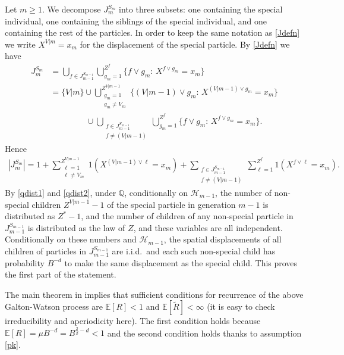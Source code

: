 \documentclass[12pt]{article}
\makeatletter
\renewenvironment{proof}[1][\proofname]{%
\par\pushQED{\qed}\normalfont%
\topsep6\p@\@plus6\p@\relax
\trivlist\item[\hskip\labelsep\bfseries#1\@addpunct{.}]%
\ignorespaces
}{%
\popQED\endtrivlist\@endpefalse
}
\numberwithin{theorem}{section}
\theoremstyle{def}
\numberwithin{equation}{section}
\newcommand{\E}{\mathbb{E}}
\newcommand{\Q}{\mathbb{Q}}
\newcommand{\cH}{\mathcal H}
\makeatother
\begin{document}
\begin{proof}
Let $m\geq 1$. We decompose $J^{S_m}_m$ into three subsets: one containing the special individual, one containing the siblings of the special individual, and one containing the rest of the particles. 
In order to keep the same notation as \eqref{Jdefn} we write $X^{V|m}= x_m$ for the displacement of the special particle. By \eqref{Jdefn} we have
\begin{align*}
J^{S_m}_m&=\bigcup_{f\in J_{m-1}^{S_{m-1}}}\bigcup_{g_m=1}^{Z^f}\{f\vee g_m:\, X^{f\vee g_m}=x_m\}\\
&=\{V|m\} \cup \bigcup_{\substack{g_m=1\\ g_m\neq V_m}}^{Z^{V|m-1}} \{(V|m-1)\vee g_m:\, X^{(V|m-1)\vee g_m}=x_m\}\\
&\phantom{=\{V|m\}\ } \cup \bigcup_{\substack {f\in J_{m-1}^{S_{m-1}}\\ f \neq(V|m-1)}}\bigcup_{g_m=1}^{Z^f}\{f\vee g_m:\, X^{f\vee g_m}=x_m \}.
\end{align*}
Hence
	\begin{align*}
		|J^{S_m}_m|= 1 + \sum_{\substack{\ell=1\\ \ell\neq V_m}}^{Z^{V|m-1}} 1(X^{(V|m-1)\vee\ell}=x_m) + \sum_{\substack {f\in J_{m-1}^{S_{m-1}}\\ f \neq(V|m-1)}}\sum_{\ell=1}^{Z^f}1(X^{f\vee\ell}=x_m).
	\end{align*}
By \eqref{qdist1} and \eqref{qdist2}, under $\Q$, conditionally on $\cH_{m-1}$, the number of non-special children $Z^{V|m-1}-1$ of the special particle in generation $m-1$ is distributed as $Z^*-1$, and the number of children of any non-special particle in $J_{m-1}^{S_{m-1}}$ is distributed as the law of $Z$, and these variables are all independent.
Conditionally on these numbers and $\cH_{m-1}$, the spatial displacements of all children of particles in $J_{m-1}^{S_{m-1}}$ are i.i.d.\ and each such non-special child has probability $B^{-d}$ to make the same displacement as the special child.
This proves the first part of the statement.


The main theorem in \cite{Hea66} implies that sufficient conditions for recurrence of the above Galton-Watson process are $\E\left[R\right]<1$ and $\E[\tilde{R}]< \infty$ (it is easy to check irreducibility and aperiodicity here).   
The first condition holds because 
 $\E\left[R\right] = \mu B^{-d} = B^{\frac{2}{\beta} - d} <1$ and the second condition holds thanks to assumption \eqref{pk}. 
\end{proof}
\end{document}
